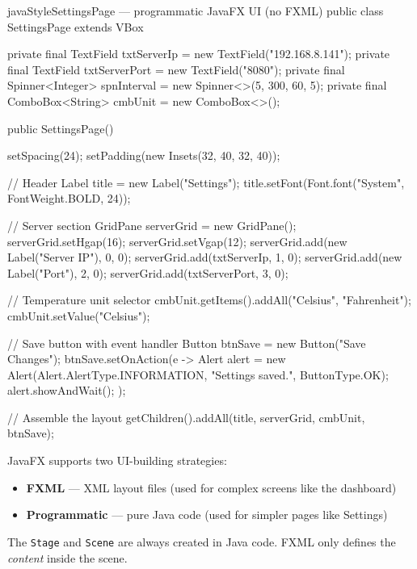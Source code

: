 \documentclass[12pt, a4paper]{report}
\begin{document}
\begin{codeblock}{javaStyle}{SettingsPage --- programmatic JavaFX UI (no FXML)}
public class SettingsPage extends VBox {

    private final TextField txtServerIp   = new TextField("192.168.8.141");
    private final TextField txtServerPort = new TextField("8080");
    private final Spinner<Integer> spnInterval = new Spinner<>(5, 300, 60, 5);
    private final ComboBox<String> cmbUnit     = new ComboBox<>();

    public SettingsPage() {
        setSpacing(24);
        setPadding(new Insets(32, 40, 32, 40));

        // Header
        Label title = new Label("Settings");
        title.setFont(Font.font("System", FontWeight.BOLD, 24));

        // Server section
        GridPane serverGrid = new GridPane();
        serverGrid.setHgap(16);
        serverGrid.setVgap(12);
        serverGrid.add(new Label("Server IP"), 0, 0);
        serverGrid.add(txtServerIp, 1, 0);
        serverGrid.add(new Label("Port"), 2, 0);
        serverGrid.add(txtServerPort, 3, 0);

        // Temperature unit selector
        cmbUnit.getItems().addAll("Celsius", "Fahrenheit");
        cmbUnit.setValue("Celsius");

        // Save button with event handler
        Button btnSave = new Button("Save Changes");
        btnSave.setOnAction(e -> {
            Alert alert = new Alert(Alert.AlertType.INFORMATION,
                "Settings saved.", ButtonType.OK);
            alert.showAndWait();
        });

        // Assemble the layout
        getChildren().addAll(title, serverGrid, cmbUnit, btnSave);
    }
}
\end{codeblock}

\begin{tcolorbox}[infobox, title={Why Two Approaches?}]
JavaFX supports two UI-building strategies:
\begin{itemize}[noitemsep]
    \item \textbf{FXML} --- XML layout files (used for complex screens like the dashboard)
    \item \textbf{Programmatic} --- pure Java code (used for simpler pages like Settings)
\end{itemize}
The \texttt{Stage} and \texttt{Scene} are always created in Java code. FXML only defines the \emph{content} inside the scene.
\end{tcolorbox}
\end{document}
